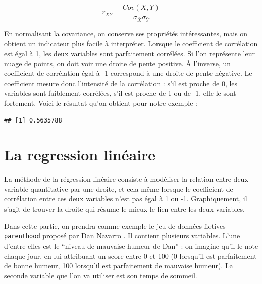 \documentclass[
]{book}
\newenvironment{Shaded}{\begin{snugshade}}{\end{snugshade}}
\newcommand{\FunctionTok}[1]{\textcolor[rgb]{0.00,0.00,0.00}{#1}}
\newcommand{\NormalTok}[1]{#1}
\newcommand{\SpecialCharTok}[1]{\textcolor[rgb]{0.00,0.00,0.00}{#1}}
\begin{document}
\[ r_{XY} = \frac{Cov(X,Y)}{\sigma_{\bar{X}}\sigma_{\bar{Y}}} \]

En normalisant la covariance, on conserve ses propriétés intéressantes,
mais on obtient un indicateur plus facile à interpréter. Lorsque le
coefficient de corrélation est égal à 1, les deux variables sont
parfaitement corrélées. Si l'on représente leur nuage de points, on doit
voir une droite de pente positive. À l'inverse, un coefficient de
corrélation égal à -1 correspond à une droite de pente négative. Le coefficient mesure donc l'intensité de la corrélation : s'il est proche de 0, les variables sont faiblement corrélées, s'il est proche de 1 ou de -1, elle le sont fortement. Voici
le résultat qu'on obtient pour notre exemple :

\begin{Shaded}
\end{Shaded}

\begin{verbatim}
## [1] 0.5635788
\end{verbatim}

\hypertarget{la-regression-linuxe9aire}{%
\section{La regression linéaire}\label{la-regression-linuxe9aire}}

La méthode de la régression linéaire consiste à modéliser la relation
entre deux variable quantitative par une droite, et cela même lorsque le
coefficient de corrélation entre ces deux variables n'est pas égal à 1
ou -1. Graphiquement, il s'agit de trouver la droite qui résume le mieux
le lien entre les deux variables.

Dans cette partie, on prendra comme exemple le jeu de données fictives \texttt{parenthood} proposé par Dan Navarro \citep{navarro2015}. Il contient plusieurs
variables. L'une d'entre elles est le ``niveau de mauvaise humeur de Dan''
: on imagine qu'il le note chaque jour, en lui attribuant un score entre
0 et 100 (0 lorsqu'il est parfaitement de bonne humeur, 100 lorsqu'il est parfaitement de mauvaise humeur). La seconde variable que l'on va utiliser est son temps de sommeil.
\end{document}
